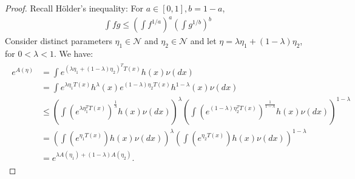 \documentclass{article}
\begin{document}
\begin{proof}
Recall H\"{o}lder's inequality: For $a \in[0,1], b=1-a$,
\begin{align*}
\int f g \leq\left(\int f^{1 / a}\right)^{a}\left(\int g^{1 / b}\right)^{b}
\end{align*}
Consider distinct parameters $\eta_{1} \in \mathcal{N}$ and $\eta_{2} \in \mathcal{N}$ and let $\eta=\lambda \eta_{1}+(1-\lambda) \eta_{2}$, for $0<\lambda<1$. We have:
\begin{align*}
\begin{aligned}
e^{A(\eta)} &=\int e^{\left(\lambda \eta_{1}+(1-\lambda) \eta_{2}\right)^{T} T(x)} h(x) \nu(d x) \\
& = \int e^{\lambda\eta_{1} T(x)} h^{\lambda}(x)  e^{(1-\lambda)\eta_{2} T(x)} h^{1-\lambda}(x) \nu(d x)\\
& \leq\left(\int\left(e^{\lambda \eta_{1}^{T} T(x)}\right)^{\frac{1}{\lambda}} h(x) \nu(d x)\right)^{\lambda}\left(\int\left(e^{(1-\lambda) \eta_{2}^{T} T(x)}\right)^{\frac{1}{1-\lambda}} h(x) \nu(d x)\right)^{1-\lambda} \\
&=\left(\int\left(e^{\eta_{1} T(x)}\right) h(x) \nu(d x)\right)^{\lambda}\left(\int\left(e^{\eta_{2} T(x)}\right) h(x) \nu(d x)\right)^{1-\lambda}\\
&= e^{\lambda A(\eta_1)+(1-\lambda)A(\eta_2)}.
\end{aligned}
\end{align*}

\end{proof}
\end{document}
